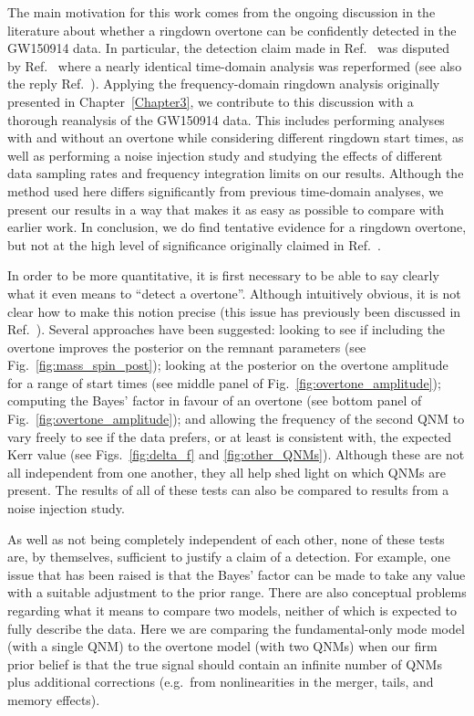 The main motivation for this work comes from the ongoing discussion in the literature about whether a ringdown overtone can be confidently detected in the GW150914 data. 
In particular, the detection claim made in Ref.~\cite{Isi:2019aib} was disputed by Ref.~\cite{Cotesta:2022pci} where a nearly identical time-domain analysis was reperformed (see also the reply Ref.~\cite{Isi:2022mhy}).
Applying the frequency-domain ringdown analysis originally presented in Chapter~\ref{Chapter3}, we contribute to this discussion with a thorough reanalysis of the GW150914 data. 
This includes performing analyses with and without an overtone while considering different ringdown start times, as well as performing a noise injection study and studying the effects of different data sampling rates and frequency integration limits on our results.
Although the method used here differs significantly from previous time-domain analyses, we present our results in a way that makes it as easy as possible to compare with earlier work.
In conclusion, we do find tentative evidence for a ringdown overtone, but not at the high level of significance originally claimed in Ref.~\cite{Isi:2019aib}.

In order to be more quantitative, it is first necessary to be able to say clearly what it even means to ``detect a overtone''. 
Although intuitively obvious, it is not clear how to make this notion precise (this issue has previously been discussed in Ref.~\cite{Isi:2022mhy}). 
Several approaches have been suggested: looking to see if including the overtone improves the posterior on the remnant parameters (see Fig.~\ref{fig:mass_spin_post}); looking at the posterior on the overtone amplitude for a range of start times (see middle panel of Fig.~\ref{fig:overtone_amplitude}); computing the Bayes' factor in favour of an overtone (see bottom panel of Fig.~\ref{fig:overtone_amplitude}); and allowing the frequency of the second QNM to vary freely to see if the data prefers, or at least is consistent with, the expected Kerr value (see Figs.~\ref{fig:delta_f} and \ref{fig:other_QNMs}).
Although these are not all independent from one another, they all help shed light on which QNMs are present. 
The results of all of these tests can also be compared to results from a noise injection study.

As well as not being completely independent of each other, none of these tests are, by themselves, sufficient to justify a claim of a detection.
For example, one issue that has been raised is that the Bayes' factor can be made to take any value with a suitable adjustment to the prior range.
There are also conceptual problems regarding what it means to compare two models, neither of which is expected to fully describe the data. Here we are comparing the fundamental-only mode model (with a single QNM) to the overtone model (with two QNMs) when our firm prior belief is that the true signal should contain an infinite number of QNMs plus additional corrections (e.g.\ from nonlinearities in the merger, tails, and memory effects).

